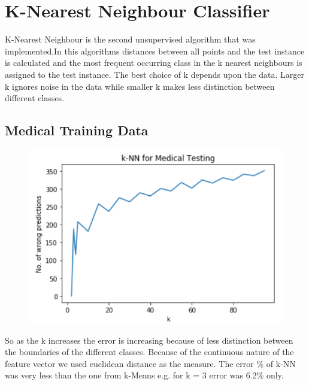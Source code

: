 \documentclass[conference]{IEEEtran}
\begin{document}
    \section{\textbf{K-Nearest Neighbour Classifier}}
    K-Nearest Neighbour is the second unsupervised algorithm that was implemented.In this algorithms distances between all points and the test instance is calculated and the most frequent occurring class in the k nearest neighbours is assigned to the test instance. The best choice of k depends upon the data. Larger k ignores noise in the data while smaller k makes less distinction between different classes.
    \subsection{Medical Training Data}
    \begin{figure}[htbp]
    \centerline{\includegraphics[width=\columnwidth]{knnmedical.PNG}}
    \label{fig}
    \end{figure}
    So as the k increases the error is increasing because of less distinction between the boundaries of the different classes. Because of the continuous nature of the feature vector we used euclidean distance as the measure. The error \% of k-NN was very less than the one from k-Means e.g. for k = 3 error was 6.2\% only. 
\end{document}
